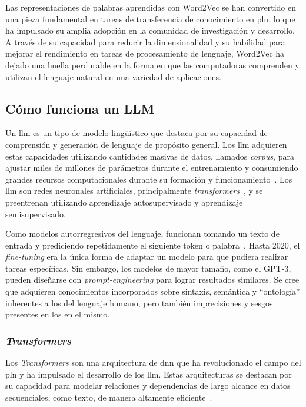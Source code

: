 Las representaciones de palabras aprendidas con Word2Vec se han convertido en una pieza fundamental en tareas de transferencia de conocimiento en \acrshort{pln}, lo que ha impulsado su amplia adopción en la comunidad de investigación y desarrollo. A través de su capacidad para reducir la dimensionalidad y su habilidad para mejorar el rendimiento en tareas de procesamiento de lenguaje, Word2Vec ha dejado una huella perdurable en la forma en que las computadoras comprenden y utilizan el lenguaje natural en una variedad de aplicaciones.

\subsection{Cómo funciona un LLM}

Un \acrfull{llm} es un tipo de modelo lingüístico que destaca por su capacidad de comprensión y generación de lenguaje de propósito general. Los \acrshort{llm} adquieren estas capacidades utilizando cantidades masivas de datos, llamados \textit{corpus}, para ajustar miles de millones de parámetros durante el entrenamiento y consumiendo grandes recursos computacionales durante su formación y funcionamiento~\cite{radford_language_2019}. Los \acrshort{llm} son redes neuronales artificiales, principalmente \textit{transformers}~\cite{Nvidia_Transformers}, y se preentrenan utilizando aprendizaje autosupervisado y aprendizaje semisupervisado.

Como modelos autorregresivos del lenguaje, funcionan tomando un texto de entrada y prediciendo repetidamente el siguiente token o palabra~\cite{bowman2023eight}. Hasta 2020, el \textit{fine-tuning} era la única forma de adaptar un modelo para que pudiera realizar tareas específicas. Sin embargo, los modelos de mayor tamaño, como el GPT-3, pueden diseñarse con \textit{prompt-engineering} para lograr resultados similares. Se cree que adquieren conocimientos incorporados sobre sintaxis, semántica y ``ontología'' inherentes a los del lenguaje humano, pero también imprecisiones y sesgos presentes en los en el mismo.

\subsubsection{\textit{Transformers}}

Los \textit{Transformers} son una arquitectura de \acrfull{dnn} que ha revolucionado el campo del \acrfull{pln} y ha impulsado el desarrollo de los \acrfull{llm}. Estas arquitecturas se destacan por su capacidad para modelar relaciones y dependencias de largo alcance en datos secuenciales, como texto, de manera altamente eficiente~\cite{Nvidia_Transformers, turner2023introduction}.

